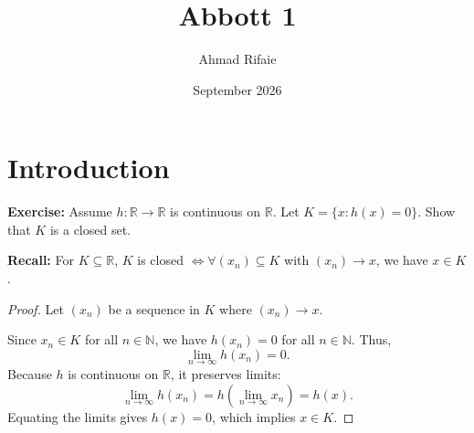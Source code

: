 \documentclass{article}
\title{Abbott 1}
\author{Ahmad Rifaie}
\date{September 2026}
\begin{document}
\maketitle

\section{Introduction}

\noindent\textbf{Exercise:} Assume $h : \mathbb{R} \to \mathbb{R}$ is continuous on $\mathbb{R}$. Let $K = \{x : h(x) = 0\}$. Show that $K$ is a closed set.

\vspace{0.5em}

\noindent\textbf{Recall:} For $K \subseteq \mathbb{R}$, $K$ is closed $\iff \forall (x_n) \subseteq K$ with $(x_n) \to x$, we have $x \in K$.

\begin{proof}
Let $(x_n)$ be a sequence in $K$ where $(x_n) \to x$.

Since $x_n \in K$ for all $n \in \mathbb{N}$, we have $h(x_n) = 0$ for all $n \in \mathbb{N}$. Thus,
\[
\lim_{n \to \infty} h(x_n) = 0.
\]
Because $h$ is continuous on $\mathbb{R}$, it preserves limits:
\[
\lim_{n \to \infty} h(x_n) = h\left(\lim_{n \to \infty} x_n\right) = h(x).
\]
Equating the limits gives $h(x) = 0$, which implies $x \in K$.
\end{proof}
\end{document}
